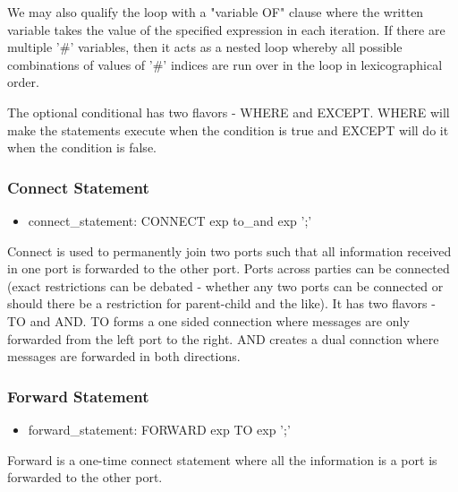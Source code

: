 \documentclass{article}
\begin{document}
We may also qualify the loop with a "variable OF" clause where the written variable takes the value of the specified expression in each iteration. If there are multiple '\#' variables, then it acts as a nested loop whereby all possible combinations of values of '\#' indices are run over in the loop in lexicographical order.

The optional conditional has two flavors - WHERE and EXCEPT. WHERE will make the statements execute when the condition is true and EXCEPT will do it when the condition is false.

\subsubsection{Connect Statement}
\begin{itemize}
\item connect\_statement: CONNECT exp to\_and exp ';'
\end{itemize}

Connect is used to permanently join two ports such that all information received in one port is forwarded to the other port. Ports across parties can be connected (exact restrictions can be debated - whether any two ports can be connected or should there be a restriction for parent-child and the like). It has two flavors - TO and AND. TO forms a one sided connection where messages are only forwarded from the left port to the right. AND creates a dual connction where messages are forwarded in both directions.


\subsubsection{Forward Statement}
\begin{itemize}
\item forward\_statement: FORWARD exp TO exp ';'
\end{itemize}

Forward is a one-time connect statement where all the information is a port is forwarded to the other port.
\end{document}

